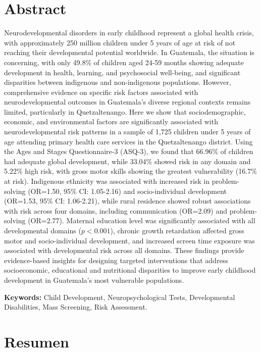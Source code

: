 \documentclass[11pt,letterpaper]{report}
\begin{document}
\chapter*{Abstract}
Neurodevelopmental disorders in early childhood represent a global health 
crisis, with approximately 250 million children under 5 years of age at risk 
of not reaching their developmental potential worldwide. In Guatemala, the 
situation is concerning, with only 49.8\% of children aged 24-59 months 
showing adequate development in health, learning, and psychosocial well-being, 
and significant disparities between indigenous and non-indigenous populations. 
However, comprehensive evidence on specific risk factors associated with 
neurodevelopmental outcomes in Guatemala's diverse regional contexts remains 
limited, particularly in Quetzaltenango. Here we show that sociodemographic, 
economic, and environmental factors are significantly associated with 
neurodevelopmental risk patterns in a sample of 1,725 children under 5 years 
of age attending primary health care services in the Quetzaltenango district. 
Using the Ages and Stages Questionnaire-3 (ASQ-3), we found that 66.96\% of 
children had adequate global development, while 33.04\% showed risk in any 
domain and 5.22\% high risk, with gross motor skills showing the greatest 
vulnerability (16.7\% at risk). Indigenous ethnicity was associated with 
increased risk in problem-solving (OR=1.50, 95\% CI: 1.05-2.16) and 
socio-individual development (OR=1.53, 95\% CI: 1.06-2.21), while rural 
residence showed robust associations with risk across four domains, including 
communication (OR=2.09) and problem-solving (OR=2.77). Maternal education 
level was significantly associated with all developmental domains ($p<0.001$), 
chronic growth retardation affected gross motor and socio-individual 
development, and increased screen time exposure was associated with 
developmental risk across all domains. These findings provide evidence-based 
insights for designing targeted interventions that address socioeconomic, 
educational and nutritional disparities to improve early childhood 
development in Guatemala's most vulnerable populations.

\textbf{Keywords:} Child Development, Neuropsychological Tests, Developmental
Disabilities, Mass Screening, Risk Assessment.

\chapter*{Resumen}
\end{document}
